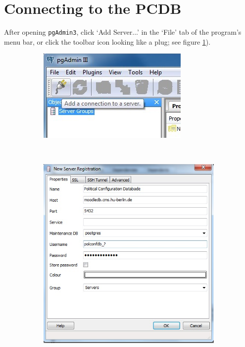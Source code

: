 \section{Connecting to the PCDB}\label{sec_connecting_to_the_PCDB}

After opening \texttt{pgAdmin3}, click `Add Server...' in the `File' tab of the program's menu bar, or click the toolbar icon looking like a plug; see figure \ref{fig_pgadmin3_add_server}).

\begin{figure}[h!]
\centering
  \begin{subfigure}{.45\textwidth}
  \includegraphics[width=\textwidth,trim= 0 0 0 0, clip]{pcdb_documentation_screenshots/pgadmin3_add_server.png}
    \label{fig_pgadmin3_add_server}
  \end{subfigure}
  ~%
  \begin{subfigure}{.45\textwidth}
  \includegraphics[width=\textwidth,trim= 0 0 0 0, clip]{pcdb_documentation_screenshots/pgadmin3_new_server_registration.png}

\end{subfigure}
\end{figure}
